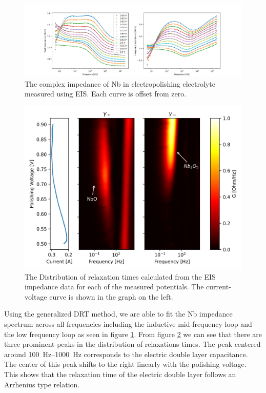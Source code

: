 \documentclass{revtex4-2}
\begin{document}
\begin{figure}[t]
  
  \includegraphics[width=\textwidth]{../figures/bodeplot.png}
  \caption{The complex impedance of Nb in electropolishing electrolyte measured using EIS. Each curve is offset from zero.}
  \label{fig:bodeplot}
\end{figure}

\begin{figure}[t]
  
  \includegraphics[width=\textwidth]{../figures/gamma.png}  
  \caption{The Distribution of relaxation times calculated from the EIS impedance data for each of the measured potentials. The current-voltage curve is shown in the graph on the left.}
  \label{fig:gamma}
\end{figure}

Using the generalized DRT method, we are able to fit the Nb impedance spectrum across all frequencies including the inductive mid-frequency loop and the low frequency loop as seen in figure \ref{fig:bodeplot}. From figure \ref{fig:gamma} we can see that there are three prominent peaks in the distribution of relaxations times. The peak centered around \qtyrange{100}{1000}{\hertz} corresponds to the electric double layer capacitance. The center of this peak shifts to the right linearly with the polishing voltage. This shows that the relaxation time of the electric double layer follows an Arrhenius type relation.
\end{document}
